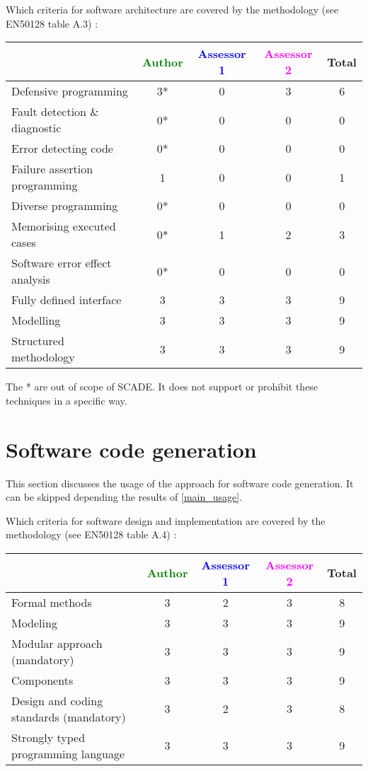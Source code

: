 Which criteria for software architecture are covered by the methodology
(see EN50128 table A.3) :

\begin{tabular}{|l | c | c | c | c|}
\hline
& \textcolor{green}{Author} & \textcolor{blue}{Assessor 1} & \textcolor{magenta}{Assessor 2} & Total \\
\hline
Defensive programming  & 3* & 0 &3 &  6 \\
\hline 
Fault detection \& diagnostic  & 0* & 0 &0 & 0 \\
\hline
Error detecting code  & 0* & 0 &0 & 0 \\
\hline
Failure assertion programming & 1 & 0 &0 & 1 \\
\hline
Diverse programming & 0* & 0 &0 & 0 \\
\hline
Memorising executed cases & 0* & 1 &2 & 3 \\
\hline
Software error effect analysis & 0* & 0 &0 & 0 \\
\hline
Fully defined interface & 3 & 3 &3 & 9 \\
\hline
Modelling  & 3 & 3 &3 & 9 \\
\hline
Structured methodology & 3 & 3 &3 & 9 \\
\hline
\end{tabular}

\begin{author_comment}
The * are out of scope of SCADE. It does not support or prohibit these techniques in a specific way.   
\end{author_comment}


\section{Software code generation}
This section discusses the usage of the approach for software code generation.
It can be skipped depending the results of \ref{main_usage}.

Which criteria for software design and implementation are covered by the methodology
(see EN50128 table A.4) :

\begin{tabular}{|l | c | c | c | c|}
\hline
& \textcolor{green}{Author} & \textcolor{blue}{Assessor 1} & \textcolor{magenta}{Assessor 2} & Total \\
\hline
Formal methods  & 3 & 2 &3 & 8 \\
\hline 
Modeling  & 3 & 3 &3 & 9 \\
\hline
Modular approach (mandatory) & 3 & 3 &3 & 9 \\
\hline
Components & 3 & 3 &3 & 9 \\
\hline
Design and coding standards (mandatory) & 3 & 2 &3 & 8 \\
\hline
Strongly typed programming language & 3 & 3 &3 & 9 \\
\hline
\end{tabular}

